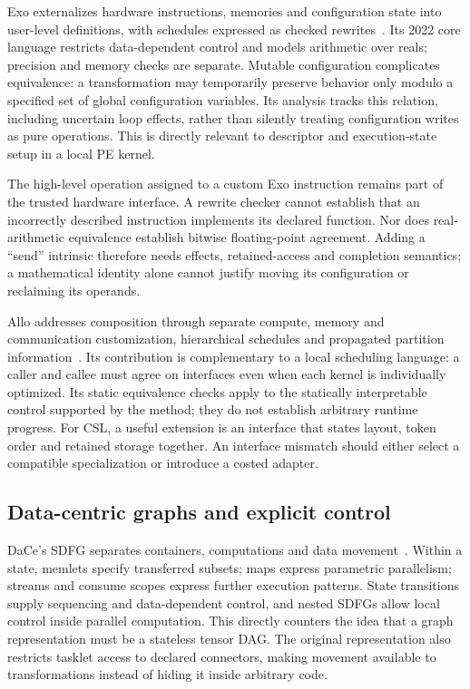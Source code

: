 \documentclass[final,3p,times,authoryear]{elsarticle}
\begin{document}
Exo externalizes hardware instructions, memories and configuration state into user-level definitions, with schedules expressed as checked rewrites~\citep{exo2022}. Its 2022 core language restricts data-dependent control and models arithmetic over reals; precision and memory checks are separate. Mutable configuration complicates equivalence: a transformation may temporarily preserve behavior only modulo a specified set of global configuration variables. Its analysis tracks this relation, including uncertain loop effects, rather than silently treating configuration writes as pure operations. This is directly relevant to descriptor and execution-state setup in a local PE kernel.

The high-level operation assigned to a custom Exo instruction remains part of the trusted hardware interface. A rewrite checker cannot establish that an incorrectly described instruction implements its declared function. Nor does real-arithmetic equivalence establish bitwise floating-point agreement. Adding a ``send'' intrinsic therefore needs effects, retained-access and completion semantics; a mathematical identity alone cannot justify moving its configuration or reclaiming its operands.

Allo addresses composition through separate compute, memory and communication customization, hierarchical schedules and propagated partition information~\citep{chen2024allo}. Its contribution is complementary to a local scheduling language: a caller and callee must agree on interfaces even when each kernel is individually optimized. Its static equivalence checks apply to the statically interpretable control supported by the method; they do not establish arbitrary runtime progress. For CSL, a useful extension is an interface that states layout, token order and retained storage together. An interface mismatch should either select a compatible specialization or introduce a costed adapter.

\subsection{Data-centric graphs and explicit control}
DaCe's SDFG separates containers, computations and data movement~\citep{bennun2019}. Within a state, memlets specify transferred subsets; maps express parametric parallelism; streams and consume scopes express further execution patterns. State transitions supply sequencing and data-dependent control, and nested SDFGs allow local control inside parallel computation. This directly counters the idea that a graph representation must be a stateless tensor DAG. The original representation also restricts tasklet access to declared connectors, making movement available to transformations instead of hiding it inside arbitrary code.
\end{document}
